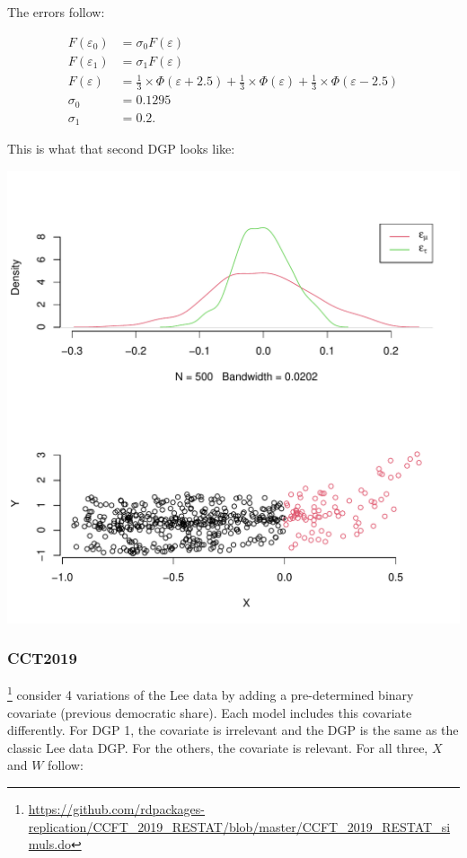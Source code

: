 \documentclass[11pt]{article}
\begin{document}
The errors follow:

\begin{equation}
  \begin{split}
    F(\varepsilon_0) &= \sigma_0 F(\varepsilon)\\
    F(\varepsilon_1) &= \sigma_1 F(\varepsilon)\\
    F(\varepsilon) &= \frac{1}{3} \times \Phi(\varepsilon + 2.5) + \frac{1}{3} \times \Phi(\varepsilon) + \frac{1}{3} \times \Phi(\varepsilon - 2.5)\\
    \sigma_0 &= 0.1295\\
    \sigma_1 &= 0.2.
  \end{split}
\end{equation}

This is what that second DGP looks like:

\begin{center}
\includegraphics[width=.9\linewidth]{cgs2023.pdf}
\end{center}

\subsubsection{CCT2019}
\label{sec:org4281de9}
\cite{calonico2019regression}\footnote{\url{https://github.com/rdpackages-replication/CCFT\_2019\_RESTAT/blob/master/CCFT\_2019\_RESTAT\_simuls.do}} consider 4 variations of
the Lee data by adding a pre-determined binary covariate
(previous democratic share). Each model includes this
covariate differently. For DGP 1, the covariate is
irrelevant and the DGP is the same as the classic Lee data
DGP. For the others, the covariate is relevant. For all
three, \(X\) and \(W\) follow:
\end{document}
